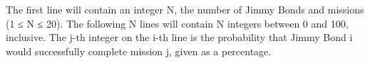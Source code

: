 The first line will contain an integer N, the number of Jimmy Bonds and missions (1 ≤ N ≤ 20). The following N lines will contain N integers between 0 and 100, inclusive. The j-th integer on the i-th line is the probability that Jimmy Bond i would successfully complete mission j, given as a percentage.